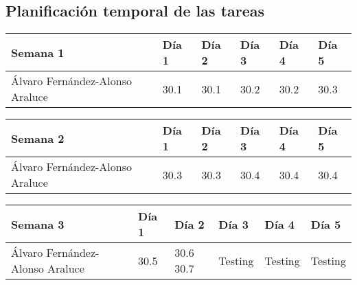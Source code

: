 \newpage

\subsection{Planificación temporal de las tareas}

\begin{table}[h]
	\centering
	\begin{tabular}{| p{2cm} | p{2cm} | p{2cm} | p{2cm} | p{2cm} | p{2cm} |}
		\rowcolor[HTML]{329A9D} 
		{\color[HTML]{FFFFFF} \textbf{Semana 1}} & {\color[HTML]{FFFFFF} \textbf{Día 1}} & {\color[HTML]{FFFFFF} \textbf{Día 2}} & {\color[HTML]{FFFFFF} \textbf{Día 3}} & {\color[HTML]{FFFFFF} \textbf{Día 4}}  & {\color[HTML]{FFFFFF} \textbf{Día 5}} \\ \hline
		Álvaro Fernández-Alonso Araluce & 30.1 & 30.1 & 30.2 & 30.2 & 30.3 \\ \hline
	\end{tabular}
\end{table}

\begin{table}[h]
	\centering
	\begin{tabular}{| p{2cm} | p{2cm} | p{2cm} | p{2cm} | p{2cm} | p{2cm} |}
		\rowcolor[HTML]{329A9D} 
		{\color[HTML]{FFFFFF} \textbf{Semana 2}} & {\color[HTML]{FFFFFF} \textbf{Día 1}} & {\color[HTML]{FFFFFF} \textbf{Día 2}} & {\color[HTML]{FFFFFF} \textbf{Día 3}} & {\color[HTML]{FFFFFF} \textbf{Día 4}}  & {\color[HTML]{FFFFFF} \textbf{Día 5}} \\ \hline
		Álvaro Fernández-Alonso Araluce & 30.3 & 30.3 & 30.4 & 30.4 & 30.4 \\ \hline
	\end{tabular}
\end{table}

\begin{table}[h]
	\centering
	\begin{tabular}{| p{2cm} | p{2cm} | p{2cm} | p{2cm} | p{2cm} | p{2cm} |}
		\rowcolor[HTML]{329A9D} 
		{\color[HTML]{FFFFFF} \textbf{Semana 3}} & {\color[HTML]{FFFFFF} \textbf{Día 1}} & {\color[HTML]{FFFFFF} \textbf{Día 2}} & {\color[HTML]{FFFFFF} \textbf{Día 3}} & {\color[HTML]{FFFFFF} \textbf{Día 4}}  & {\color[HTML]{FFFFFF} \textbf{Día 5}} \\ \hline
		Álvaro Fernández-Alonso Araluce & 30.5 & 30.6 30.7 & Testing &Testing & Testing \\ \hline
	\end{tabular}
\end{table}

